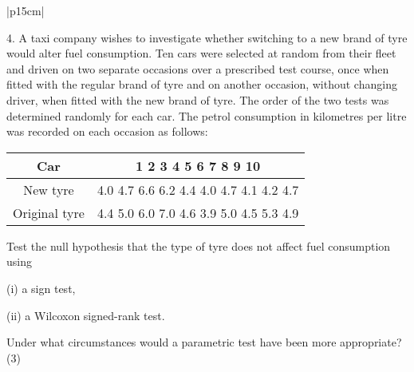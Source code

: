 \documentclass[a4paper,12pt]{article}
\begin{document}
\begin{table}[ht!]
     

\centering
     

\begin{tabular}{|p{15cm}|}
     

\hline 

 
4. A taxi company wishes to investigate whether switching to a new brand of tyre would alter fuel consumption.  Ten cars were selected at random from their fleet and driven on two separate occasions over a prescribed test course, once when fitted with the regular brand of tyre and on another occasion, without changing driver, when fitted with the new brand of tyre.  The order of the two tests was determined randomly for each car.  The petrol consumption in kilometres per litre was recorded on each occasion as follows: 


\begin{center}
\begin{tabular}{|c|c|} 
Car  &  1 2 3 4 5 6 7 8 9 10 \\ \hline 

New tyre & 4.0 4.7 6.6 6.2 4.4 4.0 4.7 4.1 4.2 4.7  \\ \hline 
Original tyre & 4.4 5.0 6.0 7.0 4.6 3.9 5.0 4.5 5.3 4.9  \\ \hline 
\end{tabular}
\end{center} 
 Test the null hypothesis that the type of tyre does not affect fuel consumption using 
 
(i) a sign test, 

(ii) a Wilcoxon signed-rank test. 
 
 
Under what circumstances would a parametric test have been more appropriate? (3) 
\\ \hline


\end{tabular}
    

\end{table}
\end{document}
